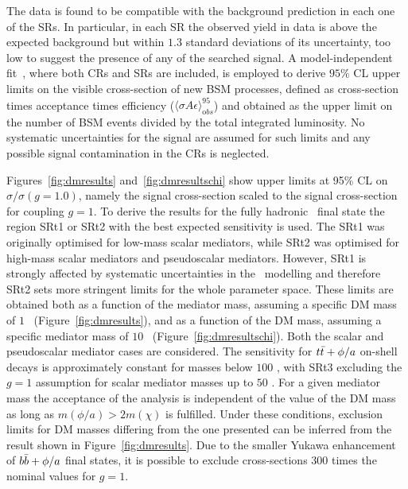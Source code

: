 		The data is found to be compatible with the background prediction in each one of the \acp{SR}. In particular, in each \ac{SR} the observed yield in data is above the expected background but within $1.3$ standard deviations of its uncertainty, too low to suggest the presence of any of the searched signal. A model-independent fit~\cite{histfitter}, where both \acp{CR} and \acp{SR} are included, is employed to derive $95\%$ \ac{CL} upper limits on the visible cross-section of new \ac{BSM} processes, defined as cross-section times acceptance times efficiency ($\langle\sigma A \epsilon\rangle_{\mathrm obs}^{95}$) and obtained as the upper limit on the number of BSM events divided by the total integrated luminosity. No systematic uncertainties for the signal are assumed for such limits and any possible signal contamination in the \acp{CR} is neglected. %

		Figures~\ref{fig:dmresults} and~\ref{fig:dmresultschi} show upper limits at 95\% CL on $\sigma / \sigma (g = 1.0)$, namely the signal cross-section scaled to the signal cross-section for coupling $g = 1$. To derive the results for the fully hadronic \ttbar\ final state the region SRt1 or SRt2 with the best expected sensitivity is used. The SRt1 was originally optimised for low-mass scalar mediators, while SRt2 was optimised for high-mass scalar mediators and pseudoscalar mediators. However, SRt1 is strongly affected by systematic uncertainties in the \ttbar\ modelling and therefore SRt2 sets more stringent limits for the whole parameter space. These limits are obtained both as a function of the mediator mass, assuming a specific \ac{DM} mass of $1$ \GeV\ (Figure~\ref{fig:dmresults}), and as a function of the \ac{DM} mass, assuming a specific mediator mass of $10$ \GeV\ (Figure~\ref{fig:dmresultschi}). Both the scalar and pseudoscalar mediator cases are considered. The sensitivity for $t\bar{t} + \phi/a$ on-shell decays is approximately constant for masses below $100$ \GeV, with SRt3 excluding the $g = 1$ assumption for scalar mediator masses up to $50$ \GeV. For a given mediator mass the acceptance of the analysis is independent of the value of the \ac{DM} mass as long as $m(\phi / a) > 2  m(\chi)$ is fulfilled. Under these conditions, exclusion limits for \ac{DM} masses differing from the one presented can be inferred from the result shown in Figure~\ref{fig:dmresults}. Due to the smaller Yukawa enhancement of $b\bar{b} + \phi / a$ final states, it is possible to exclude cross-sections $300$ times the nominal values for $g = 1$.


